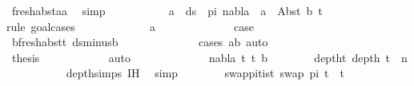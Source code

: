 \begin{isabellebody}
\ fresh{\isacharunderscore}{\kern0pt}abst{\isacharunderscore}{\kern0pt}aa\ \isamarkupfalse%
\ simp\isanewline
\ \ \ \ \ \ \ \ \isamarkupfalse%
\ {\isachardoublequoteopen}{\isasymforall}\ a\ {\isasymin}\ ds\ {\isacharbrackleft}{\kern0pt}{\isacharbrackright}{\kern0pt}\ pi{\isachardot}{\kern0pt}\ nabla\ {\isasymturnstile}\ a\ {\isasymsharp}\ Abst\ b\ t{}{\isachardoublequoteclose}\isanewline
\ \ \ \ \ \ \ \ \isamarkupfalse%
{\isacharparenleft}{\kern0pt}rule{\isacharcomma}{\kern0pt}\ goal{\isacharunderscore}{\kern0pt}cases{\isacharparenright}{\kern0pt}\isanewline
\ \ \ \ \ \ \ \ \ \ \isamarkupfalse%
\ {\isacharparenleft}{\kern0pt}{}\ a{\isacharparenright}{\kern0pt}\isanewline
\ \ \ \ \ \ \ \ \ \ \isamarkupfalse%
\ \isamarkupfalse%
\ {\isacharquery}{\kern0pt}case\isanewline
\ \ \ \ \ \ \ \ \ \ \ \ \isamarkupfalse%
\ b{\isacharunderscore}{\kern0pt}fresh{\isacharunderscore}{\kern0pt}abst{\isacharunderscore}{\kern0pt}t{}\ ds{\isacharunderscore}{\kern0pt}minus{\isacharunderscore}{\kern0pt}b\isanewline
\ \ \ \ \ \ \ \ \ \ \ \ \isamarkupfalse%
\ {\isacharparenleft}{\kern0pt}cases\ {\isachardoublequoteopen}a{\isacharequal}{\kern0pt}b{\isachardoublequoteclose}{\isacharcomma}{\kern0pt}\ auto{\isacharparenright}{\kern0pt}\isanewline
\ \ \ \ \ \ \ \ \isamarkupfalse%
\isanewline
\ \ \ \ \ \ \ \ \isamarkupfalse%
\ {}\ \isamarkupfalse%
\ {\isacharquery}{\kern0pt}thesis\isanewline
\ \ \ \ \ \ \ \ \ \ \isamarkupfalse%
\ auto\isanewline
\ \ \ \ \isamarkupfalse%
\isanewline
\ \ \ \ \ \ \isamarkupfalse%
\ {\isacharparenleft}{\kern0pt}{}\ nabla\ t{}\ t{}\ b{\isacharparenright}{\kern0pt}\isanewline
\ \ \ \ \ \ \isamarkupfalse%
\ deptht{}{\isacharcolon}{\kern0pt}\ {\isachardoublequoteopen}depth\ t{}\ {\isacharless}{\kern0pt}\ n{\isachardoublequoteclose}\isanewline
\ \ \ \ \ \ \ \ \isamarkupfalse%
\ {}\ depth{\isachardot}{\kern0pt}simps{\isacharparenleft}{\kern0pt}{}{\isacharparenright}{\kern0pt}\ IH\ \isamarkupfalse%
\ simp\isanewline
\ \ \ \ \ \ \isamarkupfalse%
\ swap{\isacharunderscore}{\kern0pt}pi{\isacharunderscore}{\kern0pt}t{}{\isacharunderscore}{\kern0pt}is{\isacharunderscore}{\kern0pt}t{}{\isacharcolon}{\kern0pt}\ {\isachardoublequoteopen}swap\ pi\ t{}\ {\isacharequal}{\kern0pt}\ t{}{\isachardoublequoteclose}\isanewline

\end{isabellebody}
